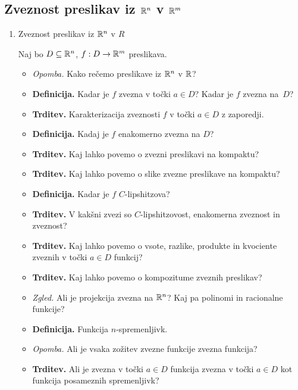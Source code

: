 \subsection{Zveznost preslikav iz $\mathbb{R}^n$ v $\mathbb{R}^m$}
\begin{enumerate}
    \item Zveznost preslikav iz $\mathbb{R}^n$ v $R$ 
    
    Naj bo $D \subseteq \mathbb{R}^n$, $f: D \to \mathbb{R}^m$ preslikava. 
    \begin{itemize}        
        \item \colorbox{yellow!30}{\emph{Opomba.}} Kako rečemo preslikave iz $\mathbb{R}^n$ v $\mathbb{R}$?
        \item \colorbox{purple!30}{\textbf{Definicija.}} Kadar je $f$ zvezna v točki $a \in D$? Kadar je $f$ zvezna na~$D$?
        \item \colorbox{blue!30}{\textbf{Trditev.}} Karakterizacija zveznosti $f$ v točki $a \in D$ z zaporedji.
        \item \colorbox{purple!30}{\textbf{Definicija.}} Kadaj je $f$ enakomerno zvezna na $D$?
        \item \colorbox{blue!30}{\textbf{Trditev.}} Kaj lahko povemo o zvezni preslikavi na kompaktu?
        \item \colorbox{blue!30}{\textbf{Trditev.}} Kaj lahko povemo o slike zvezne preslikave na kompaktu?
        \item \colorbox{purple!30}{\textbf{Definicija.}} Kadar je $f$ $C$-lipshitzova?
        \item \colorbox{blue!30}{\textbf{Trditev.}} V kakšni zvezi so $C$-lipshitzovost, enakomerna zveznost in zveznost?
        \item \colorbox{blue!30}{\textbf{Trditev.}} Kaj lahko povemo o vsote, razlike, produkte in kvociente zveznih v točki $a \in D$ funkcij?
        \item \colorbox{blue!30}{\textbf{Trditev.}} Kaj lahko povemo o kompozitume zveznih preslikav?
        \item \colorbox{yellow!30}{\emph{Zgled.}} Ali je projekcija zvezna na $\mathbb{R}^n$? Kaj pa polinomi in racionalne funkcije?
        \item \colorbox{purple!30}{\textbf{Definicija.}} Funkcija $n$-spremenljivk.
        \item \colorbox{yellow!30}{\emph{Opomba.}} Ali je vsaka zožitev zvezne funkcije zvezna funkcija?
        \item \colorbox{blue!30}{\textbf{Trditev.}} Ali je zvezna v točki $a \in D$ funkcija zvezna v točki $a \in D$ kot funkcija posameznih spremenljivk?

\end{itemize}
\end{enumerate}
